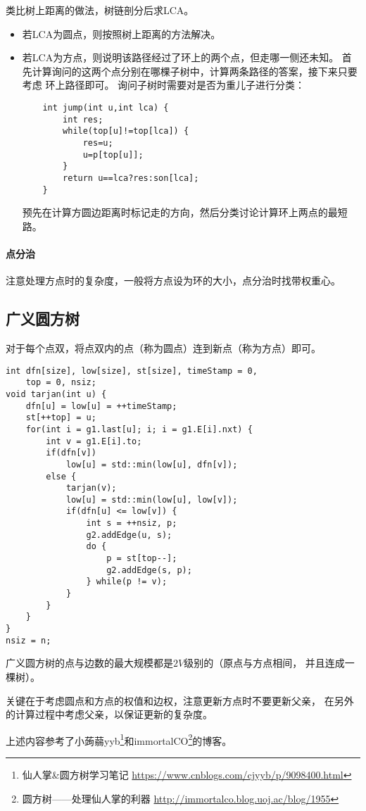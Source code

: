 类比树上距离的做法，树链剖分后求LCA。
\begin{itemize}
    \item 若LCA为圆点，则按照树上距离的方法解决。
    \item 若LCA为方点，则说明该路径经过了环上的两个点，但走哪一侧还未知。
    首先计算询问的这两个点分别在哪棵子树中，计算两条路径的答案，接下来只要考虑
    环上路径即可。
    询问子树时需要对是否为重儿子进行分类：
    \begin{lstlisting}
    int jump(int u,int lca) {
        int res;
        while(top[u]!=top[lca]) {
            res=u;
            u=p[top[u]];
        }
        return u==lca?res:son[lca];
    }
    \end{lstlisting}
    预先在计算方圆边距离时标记走的方向，然后分类讨论计算环上两点的最短路。
\end{itemize}
\paragraph{点分治}
注意处理方点时的复杂度，一般将方点设为环的大小，点分治时找带权重心。
\subsection{广义圆方树}
对于每个点双，将点双内的点（称为圆点）连到新点（称为方点）即可。
\begin{lstlisting}
int dfn[size], low[size], st[size], timeStamp = 0,
    top = 0, nsiz;
void tarjan(int u) {
    dfn[u] = low[u] = ++timeStamp;
    st[++top] = u;
    for(int i = g1.last[u]; i; i = g1.E[i].nxt) {
        int v = g1.E[i].to;
        if(dfn[v])
            low[u] = std::min(low[u], dfn[v]);
        else {
            tarjan(v);
            low[u] = std::min(low[u], low[v]);
            if(dfn[u] <= low[v]) {
                int s = ++nsiz, p;
                g2.addEdge(u, s);
                do {
                    p = st[top--];
                    g2.addEdge(s, p);
                } while(p != v);
            }
        }
    }
}
nsiz = n;
\end{lstlisting}
广义圆方树的点与边数的最大规模都是$2V$级别的（原点与方点相间，
并且连成一棵树）。

关键在于考虑圆点和方点的权值和边权，注意更新方点时不要更新父亲，
在另外的计算过程中考虑父亲，以保证更新的复杂度。

上述内容参考了小蒟蒻yyb\footnote{仙人掌\&圆方树学习笔记
    \url{https://www.cnblogs.com/cjyyb/p/9098400.html}
}和immortalCO\footnote{圆方树——处理仙人掌的利器
    \url{http://immortalco.blog.uoj.ac/blog/1955}
}的博客。
